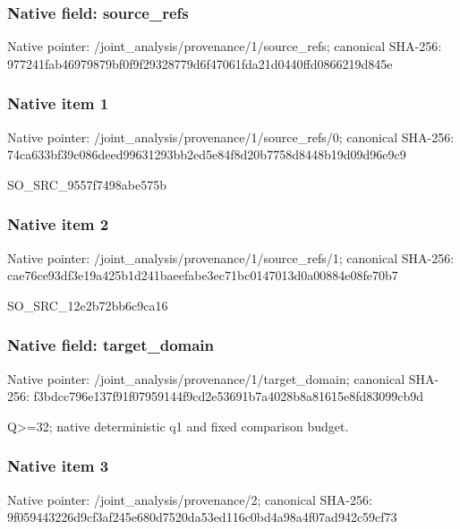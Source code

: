 \documentclass[10pt,a4paper]{article}
\begin{document}
\subsubsection{Native field: source\_refs}


Native pointer: /joint\_analysis/provenan\allowbreak{}ce/1/source\_refs; canonical SHA-256: 977241fab46979879bf0f9f2\allowbreak{}9328779d6f47061fda21d044\allowbreak{}0ffd0866219d845e



\subsubsection{Native item 1}


Native pointer: /joint\_analysis/provenan\allowbreak{}ce/1/source\_refs/0; canonical SHA-256: 74ca633bf39c086deed99631\allowbreak{}293bb2ed5e84f8d20b7758d8\allowbreak{}448b19d09d96e9c9


SO\_SRC\_9557f7498abe575b


\subsubsection{Native item 2}


Native pointer: /joint\_analysis/provenan\allowbreak{}ce/1/source\_refs/1; canonical SHA-256: cae76ce93df3e19a425b1d24\allowbreak{}1baeefabe3ec71bc0147013d\allowbreak{}0a00884e08fe70b7


SO\_SRC\_12e2b72bb6c9ca16


\subsubsection{Native field: target\_domain}


Native pointer: /joint\_analysis/provenan\allowbreak{}ce/1/target\_domain; canonical SHA-256: f3bdcc796e137f91f0795914\allowbreak{}4f9cd2e53691b7a4028b8a81\allowbreak{}615e8fd83099cb9d


Q>=32; native deterministic q1 and fixed comparison budget.


\subsubsection{Native item 3}


Native pointer: /joint\_analysis/provenance/2; canonical SHA-256: 9f059443226d9cf3af245e68\allowbreak{}0d7520da53ed116c0bd4a98a\allowbreak{}4f07ad942c59cf73
\end{document}
